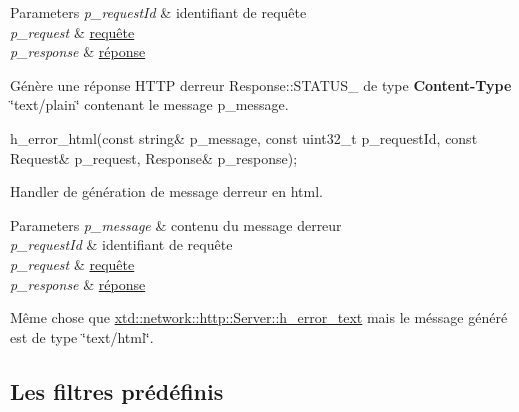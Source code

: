 \begin{DoxyItemize}
\begin{DoxyParams}{Parameters}
\hline
{\em p\+\_\+request\+Id} & identifiant de requête \\
\hline
{\em p\+\_\+request} & \hyperlink{classxtd_1_1network_1_1http_1_1Request}{requête} \\
\hline
{\em p\+\_\+response} & \hyperlink{classxtd_1_1network_1_1http_1_1Response}{réponse}\\
\hline
\end{DoxyParams}
Génère une réponse H\+T\+TP d\textquotesingle{}erreur Response\+::\+S\+T\+A\+T\+U\+S\+\_ de type {\bfseries Content-\/\+Type} \char`\"{}text/plain\char`\"{} contenant le message p\+\_\+message.
\item 
\begin{DoxyCode}
h\_error\_html(\textcolor{keyword}{const} \textcolor{keywordtype}{string}& p\_message, \textcolor{keyword}{const} uint32\_t p\_requestId, \textcolor{keyword}{const} Request& p\_request, Response& 
      p\_response); 
\end{DoxyCode}
 Handler de génération de message d\textquotesingle{}erreur en html. 
\begin{DoxyParams}{Parameters}
{\em p\+\_\+message} & contenu du message d\textquotesingle{}erreur \\
\hline
{\em p\+\_\+request\+Id} & identifiant de requête \\
\hline
{\em p\+\_\+request} & \hyperlink{classxtd_1_1network_1_1http_1_1Request}{requête} \\
\hline
{\em p\+\_\+response} & \hyperlink{classxtd_1_1network_1_1http_1_1Response}{réponse}\\
\hline
\end{DoxyParams}
Même chose que \hyperlink{classxtd_1_1network_1_1http_1_1Server_ad57a524ff44201af997e2d3557557623}{xtd\+::network\+::http\+::\+Server\+::h\+\_\+error\+\_\+text} mais le méssage généré est de type \char`\"{}text/html\char`\"{}.
\end{DoxyItemize}

\subsection*{Les filtres prédéfinis }


